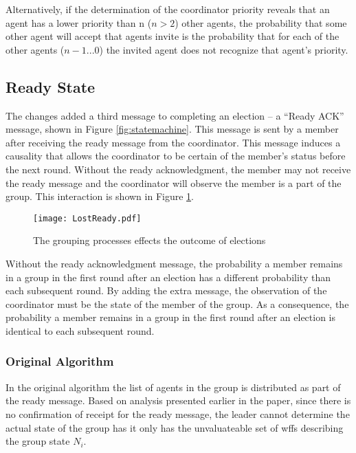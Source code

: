 Alternatively, if the determination of the coordinator priority reveals that an agent has a lower priority than n ($n > 2$) other agents, the probability that some other agent will accept that agents invite is the probability that for each of the other agents ($n-1 ... 0$) the invited agent does not recognize that agent's priority.

\subsection{Ready State}

The changes added a third message to completing an election -- a ``Ready ACK'' message, shown in Figure \ref{fig:statemachine}.
This message is sent by a member after receiving the ready message from the coordinator.
This message induces a causality that allows the coordinator to be certain of the member's status before the next round.
Without the ready acknowledgment, the member may not receive the ready message and the coordinator will observe the member is a part of the group.
This interaction is shown in Figure \ref{fig:lostready}.

\begin{figure}
\begin{centering}
\texttt{[image: LostReady.pdf]}
\caption{The grouping processes effects the outcome of elections} \label{fig:lostready}
\end{centering}
\end{figure}

Without the ready acknowledgment message, the probability a member remains in a group in the first round after an election has a different probability than each subsequent round.
By adding the extra message, the observation of the coordinator must be the state of the member of the group.
As a consequence, the probability a member remains in a group in the first round after an election is identical to each subsequent round.

\subsubsection{Original Algorithm}

In the original algorithm the list of agents in the group is distributed as part of the ready message. Based on analysis presented earlier in the paper, since there is no confirmation of receipt for the ready message, the leader cannot determine the actual state of the group has it only has the unvaluateable set of wffs describing the group state $N_i$.

